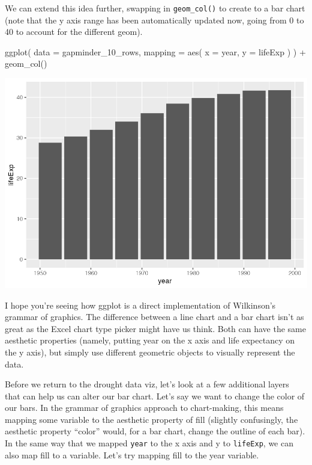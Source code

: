 \documentclass[
]{book}
\newenvironment{Shaded}{\begin{snugshade}}{\end{snugshade}}
\newcommand{\AttributeTok}[1]{\textcolor[rgb]{0.77,0.63,0.00}{#1}}
\newcommand{\FunctionTok}[1]{\textcolor[rgb]{0.00,0.00,0.00}{#1}}
\newcommand{\NormalTok}[1]{#1}
\newcommand{\SpecialCharTok}[1]{\textcolor[rgb]{0.00,0.00,0.00}{#1}}
\begin{document}
We can extend this idea further, swapping in \texttt{geom\_col()} to create to a bar chart (note that the y axis range has been automatically updated now, going from 0 to 40 to account for the different geom).

\begin{Shaded}
\begin{Highlighting}[]
\FunctionTok{ggplot}\NormalTok{(}
  \AttributeTok{data =}\NormalTok{ gapminder\_10\_rows,}
  \AttributeTok{mapping =} \FunctionTok{aes}\NormalTok{(}
    \AttributeTok{x =}\NormalTok{ year,}
    \AttributeTok{y =}\NormalTok{ lifeExp}
\NormalTok{  )}
\NormalTok{) }\SpecialCharTok{+}
  \FunctionTok{geom\_col}\NormalTok{()}
\end{Highlighting}
\end{Shaded}

\includegraphics[width=1\linewidth]{data-viz_files/figure-latex/unnamed-chunk-18-1}

I hope you're seeing how ggplot is a direct implementation of Wilkinson's grammar of graphics. The difference between a line chart and a bar chart isn't as great as the Excel chart type picker might have us think. Both can have the same aesthetic properties (namely, putting year on the x axis and life expectancy on the y axis), but simply use different geometric objects to visually represent the data.

Before we return to the drought data viz, let's look at a few additional layers that can help us can alter our bar chart. Let's say we want to change the color of our bars. In the grammar of graphics approach to chart-making, this means mapping some variable to the aesthetic property of fill (slightly confusingly, the aesthetic property ``color'' would, for a bar chart, change the outline of each bar). In the same way that we mapped \texttt{year} to the x axis and y to \texttt{lifeExp}, we can also map fill to a variable. Let's try mapping fill to the year variable.
\end{document}
